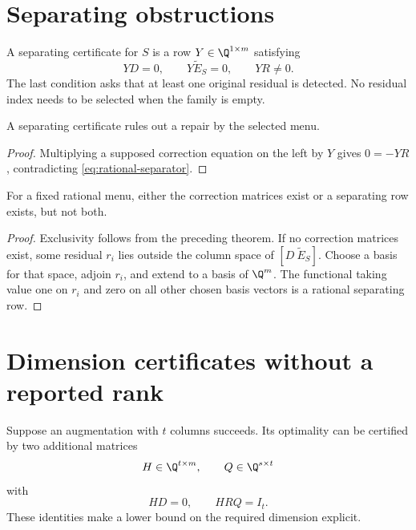 \section{Separating obstructions}
\begin{definition}
A separating certificate for $S$ is a row $Y\in\Q^{1\times m}$ satisfying
\begin{equation}\label{eq:rational-separator}
 YD=0,\qquad Y\widetilde E_S=0,\qquad YR\ne0.
\end{equation}
The last condition asks that at least one original residual is detected. No residual index needs to be selected when the family is empty.
\end{definition}

\begin{theorem}\label{thm:rational-separation}
A separating certificate rules out a repair by the selected menu.
\end{theorem}
\begin{proof}
Multiplying a supposed correction equation on the left by $Y$ gives $0=-YR$, contradicting \eqref{eq:rational-separator}.
\end{proof}

\begin{proposition}\label{prop:rational-alternative}
For a fixed rational menu, either the correction matrices exist or a separating row exists, but not both.
\end{proposition}
\begin{proof}
Exclusivity follows from the preceding theorem. If no correction matrices exist, some residual $r_i$ lies outside the column space of $[D\ \widetilde E_S]$. Choose a basis for that space, adjoin $r_i$, and extend to a basis of $\Q^m$. The functional taking value one on $r_i$ and zero on all other chosen basis vectors is a rational separating row.
\end{proof}

\section{Dimension certificates without a reported rank}
Suppose an augmentation with $t$ columns succeeds. Its optimality can be certified by two additional matrices
\[
 H\in\Q^{t\times m},\qquad Q\in\Q^{s\times t}
\]
with
\begin{equation}\label{eq:rational-dimension}
 HD=0,\qquad HRQ=I_t.
\end{equation}
These identities make a lower bound on the required dimension explicit.

